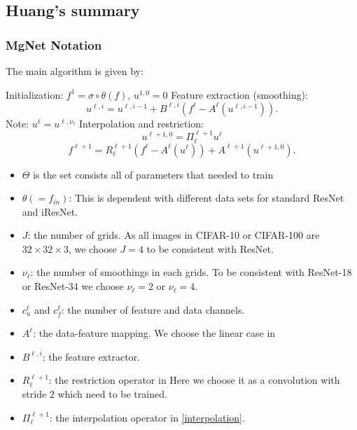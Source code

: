 \subsection{Huang's summary}

\subsubsection{MgNet Notation}
The main algorithm is given by: 
\begin{breakablealgorithm}
	\caption{$[u^1,u^2,\cdots,u^J]={\rm MgNet}(f; \Theta;J,\nu_1, \cdots, \nu_J)$}
	\label{alg:mgnet}
	\begin{algorithmic}
		\State Initialization:  $f^1 =\sigma \circ \theta(f)$, $u^{1,0}=0$
		\State Feature extraction (smoothing):
		\begin{equation}\label{mgnet}
		u^{\ell,i} = u^{\ell,i-1} + B^{\ell,i}  ({f^\ell -  A^{\ell} (u^{\ell,i-1})}).
		\end{equation}
		\EndFor
		\State Note: 
		$
		u^\ell= u^{\ell,\nu_\ell} 
		$
		\State Interpolation and restriction:
		\begin{equation}
		\label{interpolation}
		u^{\ell+1,0} = \Pi_\ell^{\ell+1}u^{\ell}
		\end{equation}
		\begin{equation}
		\label{restrict-f}
		f^{\ell+1} = R^{\ell+1}_\ell(f^\ell - A^\ell(u^{\ell})) + A^{\ell+1} (u^{\ell+1,0}).
		\end{equation}
		\EndFor
	\end{algorithmic}
\end{breakablealgorithm}




\begin{itemize}
	\item $\Theta$ is the set consists all of parameters that needed to train
	\item $\theta (=f_{in})$: This is dependent with different data sets for standard ResNet and iResNet.
	\item $J$: the number of grids. As all images in CIFAR-10 or CIFAR-100
	are $32\times 32 \times 3$,  we choose $J = 4$ to be consistent with ResNet.
	\item $\nu_\ell$:  the number of smoothings in each grids. To be consistent with
	ResNet-18 or ResNet-34 we choose $\nu_\ell = 2$ or $\nu_\ell = 4$.
	\item $c^\ell_u$ and $c^\ell_f$: the number of feature and data channels. 
	\item $A^\ell$: the data-feature mapping. We choose the linear case in 
	\item $B^{\ell,i}$: the feature extractor.
	\item $R_{\ell}^{\ell+1}$: the restriction operator in 
	Here we choose it as a convolution with stride $2$ which need to be trained.
	\item $\Pi_\ell^{\ell+1}$: the interpolation operator in
	\eqref{interpolation}.  
\end{itemize}


